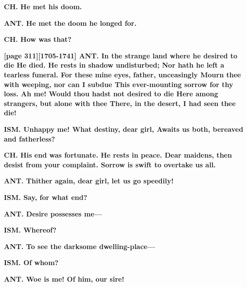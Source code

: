 \documentclass[11pt,letter]{book}
\begin{document}
\par \textbf{CH. He met his doom.}
\par 

\par \textbf{ANT. He met the doom he longed for.}
\par 

\par \textbf{CH. How was that?}
\par 

\par \textbf{[page 311][1705-1741] ANT. In the strange land where he desired to die He died. He rests in shadow undisturbed; Nor hath he left a tearless funeral. For these mine eyes, father, unceasingly Mourn thee with weeping, nor can I subdue This ever-mounting sorrow for thy loss. Ah me! Would thou hadst not desired to die Here among strangers, but alone with thee There, in the desert, I had seen thee die!}
\par 

\par \textbf{ISM. Unhappy me! What destiny, dear girl, Awaits us both, bereaved and fatherless?}
\par 

\par \textbf{CH. His end was fortunate. He rests in peace. Dear maidens, then desist from your complaint. Sorrow is swift to overtake us all.}
\par 

\par \textbf{ANT. Thither again, dear girl, let us go speedily!}
\par 

\par \textbf{ISM. Say, for what end?}
\par 

\par \textbf{ANT. Desire possesses me—}
\par 

\par \textbf{ISM. Whereof?}
\par 

\par \textbf{ANT. To see the darksome dwelling-place—}
\par 

\par \textbf{ISM. Of whom?}
\par 

\par \textbf{ANT. Woe is me! Of him, our sire!}
\par 
\end{document}
